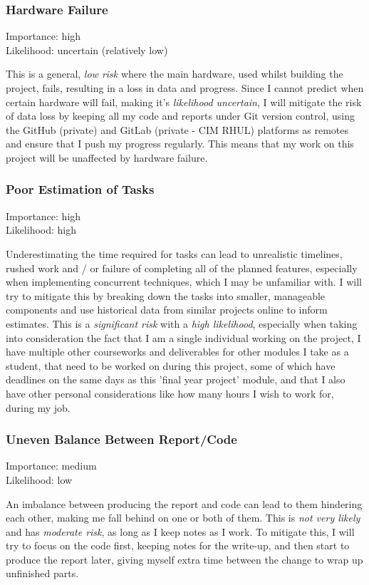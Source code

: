 \documentclass[]{plan}
\begin{document}
\newpage

\subsubsection{Hardware Failure}
Importance: high\\
Likelihood: uncertain (relatively low)

This is a general, \textit{low risk} where the main hardware, used whilst building the project, fails,
resulting in a loss in data and progress. Since I cannot predict when certain hardware will fail, making
it's \textit{likelihood uncertain}, I will mitigate the risk of data loss by keeping all my code and reports
under Git version control, using the GitHub (private) and GitLab (private - CIM RHUL) platforms as
remotes and ensure that I push my progress regularly. This means that my work on this project will
be unaffected by hardware failure.

\subsubsection{Poor Estimation of Tasks}
Importance: high\\
Likelihood: high

Underestimating the time required for tasks can lead to unrealistic timelines, rushed work and / or failure of
completing all of the planned features, especially when implementing concurrent techniques, which I may
be unfamiliar with. I will try to mitigate this by breaking down the tasks into smaller, manageable components
and use historical data from similar projects online to inform estimates. This is a \textit{significant risk} with
a \textit{high likelihood}, especially when taking into consideration the fact that I am a single individual working
on the project, I have multiple other courseworks and deliverables for other modules I take as a student,
that need to be worked on during this project, some of which have deadlines on the same days as this
'final year project' module, and that I also have other personal considerations like how many hours
I wish to work for, during my job.

\subsubsection{Uneven Balance Between Report/Code}
Importance: medium\\
Likelihood: low

An imbalance between producing the report and code can lead to them hindering each other, making me fall behind
on one or both of them. This is \textit{not very likely} and has \textit{moderate risk}, as long as I keep notes as I work. To
mitigate this, I will try to focus on the code first, keeping notes for the write-up, and then start to produce
the report later, giving myself extra time between the change to wrap up unfinished parts.
\end{document}
